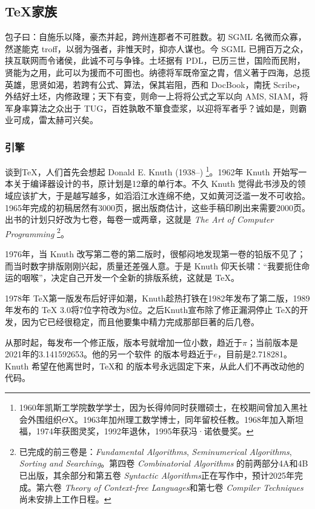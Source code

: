 \subsection{\TeX 家族}
\label{sec:tex}

包子曰：自施乐以降，豪杰并起，跨州连郡者不可胜数。初 SGML 名微而众寡，然遂能克 troff，以弱为强者，非惟天时，抑亦人谋也。今 SGML 已拥百万之众，挟互联网而令诸侯，此诚不可与争锋。土坯据有 PDL，已历三世，国险而民附，贤能为之用，此可以为援而不可图也。纳德将军既帝室之胄，信义著于四海，总揽英雄，思贤如渴，若跨有公式、算法，保其岩阻，西和 DocBook，南抚 Scribe，外结好土坯，内修政理；天下有变，则命一上将将公式之军以向 AMS, SIAM，将军身率算法之众出于 TUG，百姓孰敢不箪食壶浆，以迎将军者乎？诚如是，则霸业可成，雷太赫可兴矣。

\subsubsection{引擎}

谈到\TeX{}，人们首先会想起 Donald E. Knuth (1938--)\indexKnuth{} \footnote{1960年凯斯工学院数学学士，因为长得帅同时获赠硕士，在校期间曾加入黑社会外围组织$\Theta\mathrm{X}$。1963年加州理工数学博士，同年留校任教。1968年加入斯坦福\indexStanford{}，1974年获图灵奖，1992年退休，1995年获冯·诺依曼奖。}。1962年 Knuth 开始写一本关于编译器设计的书，原计划是12章的单行本。不久 Knuth 觉得此书涉及的领域应该扩大，于是越写越多，如滔滔江水连绵不绝，又如黄河泛滥一发不可收拾。1965年完成的初稿居然有3000页，据出版商估计，这些手稿印刷出来需要2000页。出书的计划只好改为七卷，每卷一或两章，这就是 \emph{The Art of Computer Programming} \footnote{已完成的前三卷是：\emph{Fundamental Algorithms}, \emph{Seminumerical Algorithms}, \emph{Sorting and Searching}。第四卷 \emph{Combinatorial Algorithms} 的前两部分4A和4B已出版，其余部分和第五卷 \emph{Syntactic Algorithms}正在写作中，预计2025年完成。第六卷 \emph{Theory of Context-free Languages}和第七卷 \emph{Compiler Techniques}尚未安排上工作日程。}。

1976年，当 Knuth 改写第二卷的第二版时，很郁闷地发现第一卷的铅版不见了；而当时数字排版刚刚兴起，质量还差强人意。于是 Knuth 仰天长啸：“我要扼住命运的咽喉”，决定自己开发一个全新的排版系统，这就是 \TeX。

1978年 \TeX 第一版发布后好评如潮，Knuth趁热打铁在1982年发布了第二版，1989年发布的 \TeX{} 3.0将7位字符改为8位。之后Knuth宣布除了修正漏洞停止 \TeX 的开发，因为它已经很稳定，而且他要集中精力完成那部巨著的后几卷。

从那时起，每发布一个修正版，版本号就增加一位小数，趋近于$\pi$；当前版本是2021年的3.141592653。他的另一个软件 \MF 的版本号趋近于$e$，目前是2.718281。Knuth 希望在他离世时，\TeX 和 \MF 的版本号永远固定下来，从此人们不再改动他的代码。

